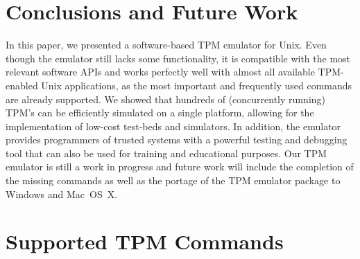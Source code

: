 \documentclass[runningheads]{llncs}
\begin{document}
\section{Conclusions and Future Work}
In this paper, we presented a software-based TPM emulator for Unix. Even though the emulator still
lacks some functionality, it is compatible with the most relevant software APIs and works perfectly
well with almost all available TPM-enabled Unix applications, as the most important and frequently
used commands are already supported. We showed that hundreds of (concurrently running) TPM's can
be efficiently simulated on a single platform, allowing for the implementation of low-cost test-beds
and simulators. In addition, the emulator provides programmers of trusted systems with a powerful
testing and debugging tool that can also be used for training and educational purposes. Our TPM
emulator is still a work in progress and future work will include the completion of the missing
commands as well as the portage of the TPM emulator package to Windows and Mac~OS~X.




\appendix

\section{Supported TPM Commands}
\newcommand{\tpmred}{tpmgray!10!red!50!white}
\newcommand{\tpmyellow}{tpmgray!10!yellow!50!white}
\newcommand{\tpmgreen}{tpmgray!10!green!50!white}
\newcommand{\tpmcolor}{tpmgray}
\end{document}

